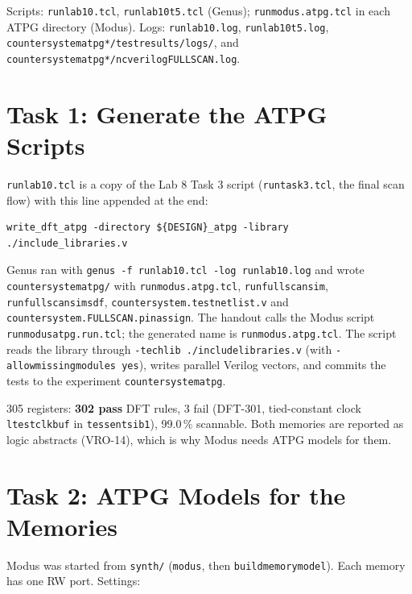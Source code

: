 \documentclass[11pt]{article}
\renewcommand{\_}{\oldus\hspace{0pt}}
\newcommand{\code}[1]{\texttt{\small #1}}
\begin{document}
Scripts: \code{run\_lab10.tcl}, \code{run\_lab10\_t5.tcl} (Genus); \code{runmodus.atpg.tcl} in each ATPG directory (Modus).
Logs: \code{run\_lab10.log}, \code{run\_lab10\_t5.log}, \code{counter\_system\_atpg*/testresults/logs/}, and
\code{counter\_system\_atpg*/ncverilog\_FULLSCAN.log}.

\section{Task 1: Generate the ATPG Scripts}

\code{run\_lab10.tcl} is a copy of the Lab 8 Task 3 script (\code{run\_task3.tcl}, the final scan flow) with this line
appended at the end:

\begin{lstlisting}
write_dft_atpg -directory ${DESIGN}_atpg -library ./include_libraries.v
\end{lstlisting}

Genus ran with \code{genus -f run\_lab10.tcl -log run\_lab10.log} and wrote \code{counter\_system\_atpg/} with
\code{runmodus.atpg.tcl}, \code{run\_fullscan\_sim}, \code{run\_fullscan\_sim\_sdf},
\code{counter\_system.test\_netlist.v} and \code{counter\_system.FULLSCAN.pinassign}. The handout calls the Modus script
\code{runmodus\_atpg.run.tcl}; the generated name is \code{runmodus.atpg.tcl}.
The script reads the library through \code{-techlib ./include\_libraries.v} (with \code{-allowmissingmodules yes}),
writes parallel Verilog vectors, and commits the tests to the experiment \code{counter\_system\_atpg}.

\begin{resultbox}
305 registers: \textbf{302 pass} DFT rules, 3 fail (DFT-301, tied-constant clock \code{ltest\_clk\_buf} in \code{tessent\_sib\_1}),
99.0\,\% scannable. Both memories are reported as logic abstracts (VRO-14), which is why Modus needs ATPG models for them.
\end{resultbox}

\section{Task 2: ATPG Models for the Memories}

Modus was started from \code{synth/} (\code{modus}, then \code{build\_memory\_model}). Each memory has one RW port. Settings:
\end{document}
